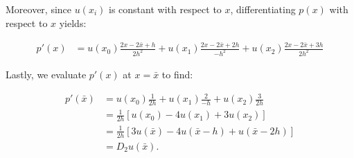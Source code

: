 \begin{solution}
    \pagebreak

    Moreover, since $u(x_i)$ is constant with respect to $x$, differentiating $p(x)$ with respect to $x$ yields:

    \begin{align*}
        p'(x) &= u(x_0)\frac{2x - 2\bar{x} + h}{2h^2}
               + u(x_1)\frac{2x - 2\bar{x} + 2h}{-h^2}
               + u(x_2)\frac{2x - 2\bar{x} + 3h}{2h^2}
    \end{align*}

    Lastly, we evaluate $p'(x)$ at $x = \bar{x}$ to find:

    \begin{align*}
        p'(\bar{x}) &= u(x_0)\frac{1}{2h} + u(x_1)\frac{2}{-h} + u(x_2)\frac{3}{2h} \\
                    &= \frac{1}{2h}\left[u(x_0) - 4u(x_1) + 3u(x_2)\right] \\
                    &= \frac{1}{2h}\left[3u(\bar{x}) - 4u(\bar{x} - h) + u(\bar{x} - 2h)\right] \\
                    &= D_{2}u(\bar{x}).
    \end{align*}
    \\
\end{solution}